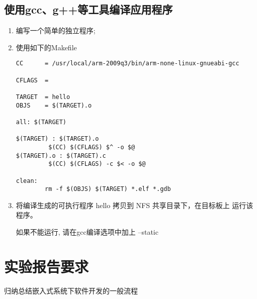 \subsection{使用gcc、g++等工具编译应用程序}
\begin{enumerate}\itemsep=-3pt
  \item 编写一个简单的独立程序;
  \item 使用如下的Makefile

      \normalsize
\begin{boxedminipage}{.9\textwidth}
\lstset{language=make}
\begin{lstlisting}
CC      = /usr/local/arm-2009q3/bin/arm-none-linux-gnueabi-gcc

CFLAGS  =

TARGET  = hello
OBJS    = $(TARGET).o

all: $(TARGET)

$(TARGET) : $(TARGET).o
         $(CC) $(CFLAGS) $^ -o $@
$(TARGET).o : $(TARGET).c
         $(CC) $(CFLAGS) -c $< -o $@

clean:
        rm -f $(OBJS) $(TARGET) *.elf *.gdb
\end{lstlisting}
\end{boxedminipage}

\large
  \item 将编译生成的可执行程序 hello 拷贝到 NFS 共享目录下，在目标板上
		运行该程序。

		如果不能运行, 请在gcc编译选项中加上 --static
\end{enumerate}

\section{实验报告要求}
    归纳总结嵌入式系统下软件开发的一般流程
